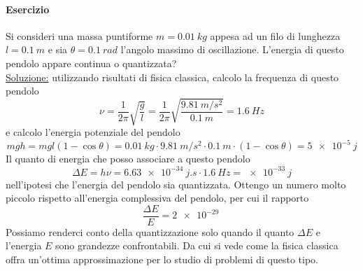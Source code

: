 \paragraph{Esercizio}
Si consideri una massa puntiforme $m=\SI{0.01}{kg}$ appesa ad un filo di lunghezza $l=\SI{0.1}{m}$ e sia $\theta=\SI{0.1}{rad}$ l'angolo massimo di oscillazione. L'energia di questo pendolo appare continua o quantizzata? \\
\underline{Soluzione:}
utilizzando risultati di fisica classica, calcolo la frequenza di questo pendolo
\begin{equation}
\nu = \frac{ 1}{2\pi } \sqrt{\frac{ g}{l }} = \frac{ 1}{2\pi }\sqrt{\frac{ \SI{9.81}{m/s^2}}{\SI{0.1}{m} }} = \SI{1.6}{Hz}
\end{equation}
e calcolo l'energia potenziale del pendolo
\begin{equation}
mgh = mgl(1-\cos \theta) = \SI{0.01}{kg} \cdot \SI{9.81}{m/s^2} \cdot \SI{0.1}{m} \cdot (1-\cos \theta) = \SI{5e-5}{j}
\end{equation}
Il quanto di energia che posso associare a questo pendolo 
\begin{equation}
\Delta E = h\nu = \SI{6.63e-34}{j.s} \cdot \SI{1.6}{Hz} = \SI{e-33}{j}
\end{equation}
nell'ipotesi che l'energia del pendolo sia quantizzata.
Ottengo un numero molto piccolo rispetto all'energia complessiva del pendolo, per cui il rapporto
\begin{equation}
\frac{ \Delta E }{E } = \SI{2e-29}{}
\end{equation}
Possiamo renderci conto della quantizzazione solo quando il quanto $\Delta E$ e l'energia $E$ sono grandezze confrontabili.
Da cui si vede come la fisica classica offra un'ottima approssimazione per lo studio di problemi di questo tipo.


